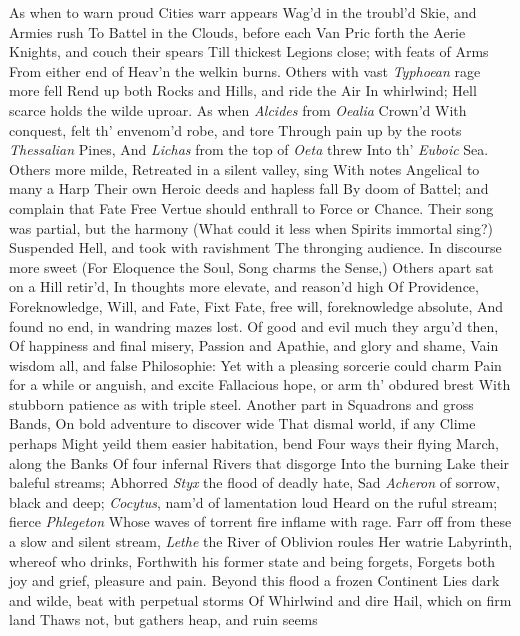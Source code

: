 \documentclass[11pt]{book}
\begin{document}
As when to warn proud Cities warr appears 
Wag'd in the troubl'd Skie, and Armies rush 
To Battel in the Clouds, before each Van 
Pric forth the Aerie Knights, and couch their spears 
Till thickest Legions close; with feats of Arms 
From either end of Heav'n the welkin burns. 
Others with vast \textit{Typhoean} rage more fell 
Rend up both Rocks and Hills, and ride the Air 
In whirlwind; Hell scarce holds the wilde uproar. 
As when \textit{Alcides} from \textit{Oealia} Crown'd 
With conquest, felt th' envenom'd robe, and tore 
Through pain up by the roots \textit{Thessalian} Pines, 
And \textit{Lichas} from the top of \textit{Oeta} threw 
Into th' \textit{Euboic} Sea.  Others more milde, 
Retreated in a silent valley, sing 
With notes Angelical to many a Harp 
Their own Heroic deeds and hapless fall 
By doom of Battel; and complain that Fate 
Free Vertue should enthrall to Force or Chance. 
Their song was partial, but the harmony 
(What could it less when Spirits immortal sing?) 
Suspended Hell, and took with ravishment 
The thronging audience.  In discourse more sweet 
(For Eloquence the Soul, Song charms the Sense,) 
Others apart sat on a Hill retir'd, 
In thoughts more elevate, and reason'd high 
Of Providence, Foreknowledge, Will, and Fate, 
Fixt Fate, free will, foreknowledge absolute, 
And found no end, in wandring mazes lost. 
Of good and evil much they argu'd then, 
Of happiness and final misery, 
Passion and Apathie, and glory and shame, 
Vain wisdom all, and false Philosophie: 
Yet with a pleasing sorcerie could charm 
Pain for a while or anguish, and excite 
Fallacious hope, or arm th' obdured brest 
With stubborn patience as with triple steel. 
Another part in Squadrons and gross Bands, 
On bold adventure to discover wide 
That dismal world, if any Clime perhaps 
Might yeild them easier habitation, bend 
Four ways their flying March, along the Banks 
Of four infernal Rivers that disgorge 
Into the burning Lake their baleful streams; 
Abhorred \textit{Styx} the flood of deadly hate, 
Sad \textit{Acheron} of sorrow, black and deep; 
\textit{Cocytus}, nam'd of lamentation loud 
Heard on the ruful stream; fierce \textit{Phlegeton} 
Whose waves of torrent fire inflame with rage. 
Farr off from these a slow and silent stream, 
\textit{Lethe} the River of Oblivion roules 
Her watrie Labyrinth, whereof who drinks, 
Forthwith his former state and being forgets, 
Forgets both joy and grief, pleasure and pain. 
Beyond this flood a frozen Continent 
Lies dark and wilde, beat with perpetual storms 
Of Whirlwind and dire Hail, which on firm land 
Thaws not, but gathers heap, and ruin seems 
\end{document}
